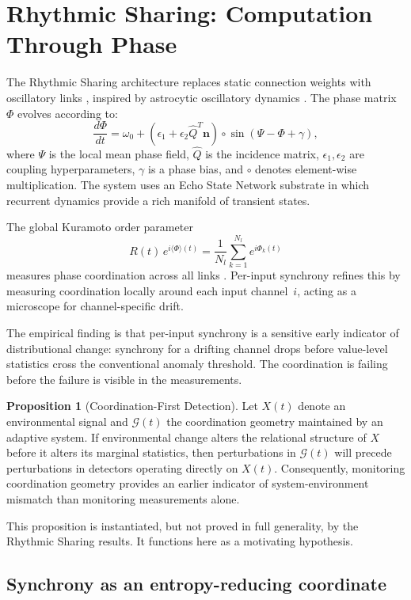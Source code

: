 \documentclass[11pt, a4paper]{article}
\theoremstyle{definition}
\newtheorem{proposition}{Proposition}
\theoremstyle{remark}
\begin{document}
\section{Rhythmic Sharing: Computation Through Phase}

The Rhythmic Sharing architecture replaces static connection weights with
oscillatory links \cite{kang2026}, inspired by astrocytic oscillatory
dynamics \cite{oneill2023}. The phase matrix $\Phi$ evolves according to:
\[
\frac{d\Phi}{dt} = \omega_0 + (\epsilon_1 + \epsilon_2 \hat{Q}^T \mathbf{n})
\circ \sin(\Psi - \Phi + \gamma),
\]
where $\Psi$ is the local mean phase field, $\hat{Q}$ is the incidence
matrix, $\epsilon_1, \epsilon_2$ are coupling hyperparameters, $\gamma$ is
a phase bias, and $\circ$ denotes element-wise multiplication. The system
uses an Echo State Network substrate \cite{jaeger2004} in which recurrent
dynamics provide a rich manifold of transient states.

The global Kuramoto order parameter
\[
R(t)\,e^{i\langle\Phi\rangle(t)} = \frac{1}{N_l}\sum_{k=1}^{N_l} e^{i\Phi_k(t)}
\]
measures phase coordination across all links \cite{acebron2005}. Per-input
synchrony refines this by measuring coordination locally around each input
channel~$i$, acting as a microscope for channel-specific drift.

The empirical finding is that per-input synchrony is a sensitive early
indicator of distributional change: synchrony for a drifting channel drops
before value-level statistics cross the conventional anomaly threshold.
The coordination is failing before the failure is visible in the measurements.

\begin{proposition}[Coordination-First Detection]
Let $X(t)$ denote an environmental signal and $\mathcal{G}(t)$ the
coordination geometry maintained by an adaptive system. If environmental
change alters the relational structure of $X$ before it alters its marginal
statistics, then perturbations in $\mathcal{G}(t)$ will precede perturbations
in detectors operating directly on $X(t)$. Consequently, monitoring
coordination geometry provides an earlier indicator of system-environment
mismatch than monitoring measurements alone.
\end{proposition}

This proposition is instantiated, but not proved in full generality, by the
Rhythmic Sharing results. It functions here as a motivating hypothesis.

\subsection*{Synchrony as an entropy-reducing coordinate}
\end{document}

